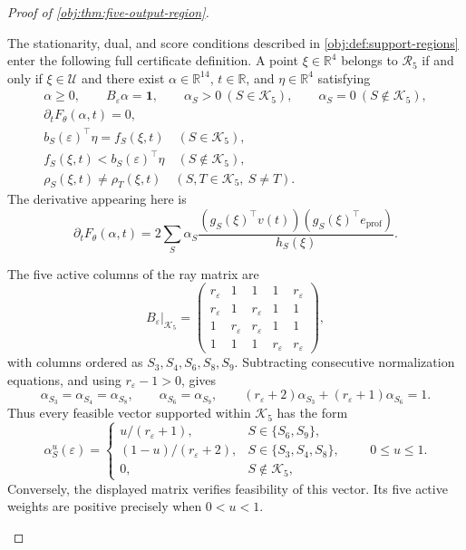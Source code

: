 \begin{proof}[Proof of \cref{obj:thm:five-output-region}]
\begin{enumerate}
The stationarity, dual, and score conditions described in
\cref{obj:def:support-regions} enter the following full certificate definition.
A point \(\xi\in\mathbb R^4\) belongs to \(\mathcal R_5\) if and only if
\(\xi\in\mathcal U\) and there exist
\(\alpha\in\mathbb R^{14}\), \(t\in\mathbb R\), and \(\eta\in\mathbb R^4\) satisfying
\[
\begin{gathered}
\alpha\ge0,\qquad B_\varepsilon\alpha=\mathbf1,\qquad
\alpha_S>0\ (S\in\mathcal K_5),\qquad
\alpha_S=0\ (S\notin\mathcal K_5),\\
\partial_tF_\theta(\alpha,t)=0,\\
b_S(\varepsilon)^\top\eta=f_S(\xi,t)\quad(S\in\mathcal K_5),\\
f_S(\xi,t)<b_S(\varepsilon)^\top\eta\quad(S\notin\mathcal K_5),\\
\rho_S(\xi,t)\ne\rho_T(\xi,t)
\quad(S,T\in\mathcal K_5,\ S\ne T).
\end{gathered}
\]
The derivative appearing here is
\[
\partial_tF_\theta(\alpha,t)
=
2\sum_S\alpha_S
\frac{(g_S(\xi)^\top v(t))(g_S(\xi)^\top e_{\mathrm{prof}})}
     {h_S(\xi)}.
\]

The five active columns of the ray matrix are
\[
B_\varepsilon\big|_{\mathcal K_5}
=
\begin{pmatrix}
r_\varepsilon&1&1&1&r_\varepsilon\\
r_\varepsilon&1&r_\varepsilon&1&1\\
1&r_\varepsilon&r_\varepsilon&1&1\\
1&1&1&r_\varepsilon&r_\varepsilon
\end{pmatrix},
\]
with columns ordered as \(S_3,S_4,S_6,S_8,S_9\).
Subtracting consecutive normalization equations, and using
\(r_\varepsilon-1>0\), gives
\[
\alpha_{S_3}=\alpha_{S_4}=\alpha_{S_8},\qquad
\alpha_{S_6}=\alpha_{S_9},\qquad
(r_\varepsilon+2)\alpha_{S_3}
+(r_\varepsilon+1)\alpha_{S_6}=1.
\]
Thus every feasible vector supported within \(\mathcal K_5\) has the form
\[
\alpha^u_S(\varepsilon)=
\begin{cases}
u/(r_\varepsilon+1),&S\in\{S_6,S_9\},\\
(1-u)/(r_\varepsilon+2),&S\in\{S_3,S_4,S_8\},\\
0,&S\notin\mathcal K_5,
\end{cases}
\qquad 0\le u\le1.
\]
Conversely, the displayed matrix verifies feasibility of this vector.
Its five active weights are positive precisely when \(0<u<1\).


\end{enumerate}
\end{proof}
